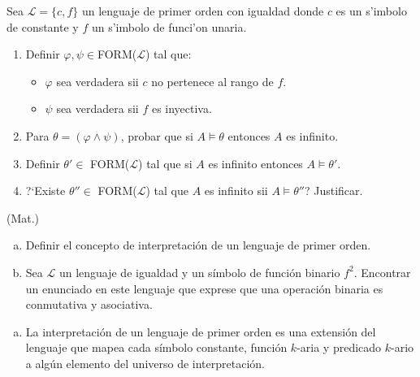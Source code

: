 \begin{questions}
\begin{solution}
\end{solution}


\question Sea $\mathcal{L} = \{c, f\}$ un lenguaje de primer orden con igualdad donde $c$ es un s'imbolo de constante y $f$ un s'imbolo de funci'on unaria. 

\begin{enumerate}
 \item Definir $\varphi, \psi \in $FORM($\mathcal{L}$) tal que: 
 
 \begin{itemize}
  \item $\varphi$ sea verdadera sii $c$ no pertenece al rango de $f$. 
  \item $\psi$ sea verdadera sii $f$ es inyectiva. 
 \end{itemize}

 \item Para $\theta = (\varphi \wedge \psi)$, probar que si $A\vDash\theta$ entonces $A$ es infinito. 
 
 \item Definir $\theta'\in$ FORM($\mathcal{L}$) tal que si $A$ es infinito entonces $A\vDash \theta'$. 
 
 \item ?`Existe $\theta'' \in$ FORM($\mathcal{L}$) tal que $A$ es infinito sii $A\vDash\theta''$? Justificar. 
\end{enumerate}

\question (Mat.) 
\begin{enumerate}[a)]
  \item Definir el concepto de interpretaci\'on de un lenguaje de primer orden. 
  \item Sea $\mathcal{L}$ un lenguaje de igualdad y un s\'imbolo de funci\'on binario $f^2$. Encontrar un enunciado en este lenguaje que exprese que una operaci\'on binaria es conmutativa y asociativa. 
\end{enumerate}

\begin{solution}
 
 \begin{enumerate}[a)]
  \item  La interpretación de un lenguaje de primer orden es una extensión del lenguaje que mapea cada símbolo constante, función $k$-aria y predicado $k$-ario a algún elemento del universo de interpretación.
  

\end{enumerate}
\end{solution}
\end{questions}

